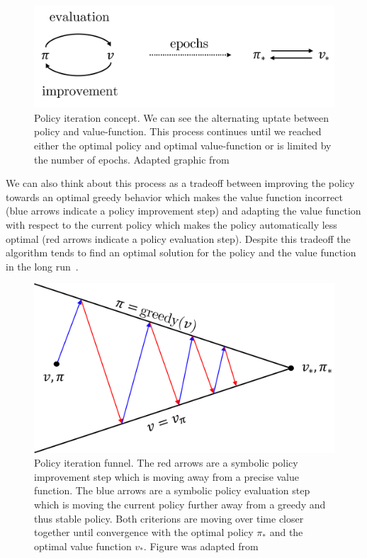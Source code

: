 % 
\begin{figure}
    \begin{center}
        \includegraphics[width=0.5\linewidth]{figures/background/PolicyIterationConcept.png}
        \caption[Policy iteration concept]{Policy iteration concept. We can see the alternating uptate between policy and value-function. This process continues until we reached either the optimal policy and optimal value-function or is limited by the number of epochs. Adapted graphic from~\cite{SuttonBartoRLBook}}
        \label{fig:policy-iteration-concept}
    \end{center}
\end{figure}

We can also think about this process as a tradeoff between improving the policy towards an optimal greedy behavior which makes the value function incorrect (blue arrows indicate a policy improvement step) and adapting the value function with respect to the current policy which makes the policy automatically less optimal (red arrows indicate a policy evaluation step). Despite this tradeoff the algorithm tends to find an optimal solution for the policy and the value function in the long run~\cite{SuttonBartoRLBook}.

% 
\begin{figure}
    \begin{center}
        \includegraphics[width=0.5\linewidth]{figures/background/PolicyIterationFunnel.png}
        \caption[Policy iteration funnel]{Policy iteration funnel. The red arrows are a symbolic policy improvement step which is moving away from a precise value function. The blue arrows are a symbolic policy evaluation step which is moving the current policy further away from a greedy and thus stable policy. Both criterions are moving over time closer together until convergence with the optimal policy $\pi_*$ and the optimal value function $v_*$. Figure was adapted from~\cite{SuttonBartoRLBook}}
        \label{fig:policy-iteration-concept-funnel}
    \end{center}
\end{figure}

